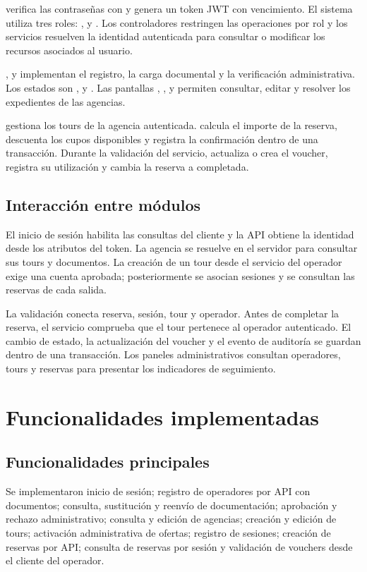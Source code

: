  verifica las contraseñas con  y genera un token JWT con vencimiento. El sistema utiliza tres roles: ,  y . Los controladores restringen las operaciones por rol y los servicios resuelven la identidad autenticada para consultar o modificar los recursos asociados al usuario.

,  y  implementan el registro, la carga documental y la verificación administrativa. Los estados son ,  y . Las pantallas , ,  y  permiten consultar, editar y resolver los expedientes de las agencias.

 gestiona los tours de la agencia autenticada.  calcula el importe de la reserva, descuenta los cupos disponibles y registra la confirmación dentro de una transacción. Durante la validación del servicio, actualiza o crea el voucher, registra su utilización y cambia la reserva a completada.

\subsection{Interacción entre módulos}
El inicio de sesión habilita las consultas del cliente y la API obtiene la identidad desde los atributos del token. La agencia se resuelve en el servidor para consultar sus tours y documentos. La creación de un tour desde el servicio del operador exige una cuenta aprobada; posteriormente se asocian sesiones y se consultan las reservas de cada salida.

La validación conecta reserva, sesión, tour y operador. Antes de completar la reserva, el servicio comprueba que el tour pertenece al operador autenticado. El cambio de estado, la actualización del voucher y el evento de auditoría se guardan dentro de una transacción. Los paneles administrativos consultan operadores, tours y reservas para presentar los indicadores de seguimiento.

\section{Funcionalidades implementadas}
\subsection{Funcionalidades principales}
Se implementaron inicio de sesión; registro de operadores por API con documentos; consulta, sustitución y reenvío de documentación; aprobación y rechazo administrativo; consulta y edición de agencias; creación y edición de tours; activación administrativa de ofertas; registro de sesiones; creación de reservas por API; consulta de reservas por sesión y validación de vouchers desde el cliente del operador.

